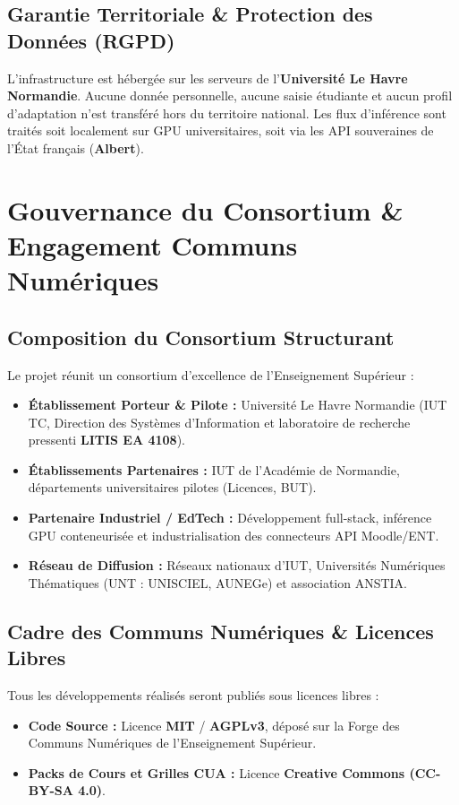 \documentclass[11pt,a4paper]{article}
\begin{document}
\subsection{Garantie Territoriale \& Protection des Données (RGPD)}
L'infrastructure est hébergée sur les serveurs de l'\textbf{Université Le Havre Normandie}. Aucune donnée personnelle, aucune saisie étudiante et aucun profil d'adaptation n'est transféré hors du territoire national. Les flux d'inférence sont traités soit localement sur GPU universitaires, soit via les API souveraines de l'État français (\textbf{Albert}).

\newpage
\section{Gouvernance du Consortium \& Engagement Communs Numériques}

\subsection{Composition du Consortium Structurant}
Le projet réunit un consortium d'excellence de l'Enseignement Supérieur :
\begin{itemize}[leftmargin=1.5em, itemsep=2pt]
    \item \textbf{Établissement Porteur \& Pilote :} Université Le Havre Normandie (IUT TC, Direction des Systèmes d'Information et laboratoire de recherche pressenti \textbf{LITIS EA 4108}).
    \item \textbf{Établissements Partenaires :} IUT de l'Académie de Normandie, départements universitaires pilotes (Licences, BUT).
    \item \textbf{Partenaire Industriel / EdTech :} Développement full-stack, inférence GPU conteneurisée et industrialisation des connecteurs API Moodle/ENT.
    \item \textbf{Réseau de Diffusion :} Réseaux nationaux d'IUT, Universités Numériques Thématiques (UNT : UNISCIEL, AUNEGe) et association ANSTIA.
\end{itemize}

\subsection{Cadre des Communs Numériques \& Licences Libres}
Tous les développements réalisés seront publiés sous licences libres :
\begin{itemize}[leftmargin=1.5em, itemsep=2pt]
    \item \textbf{Code Source :} Licence \textbf{MIT} / \textbf{AGPLv3}, déposé sur la Forge des Communs Numériques de l'Enseignement Supérieur.
    \item \textbf{Packs de Cours et Grilles CUA :} Licence \textbf{Creative Commons (CC-BY-SA 4.0)}.
\end{itemize}
\end{document}
